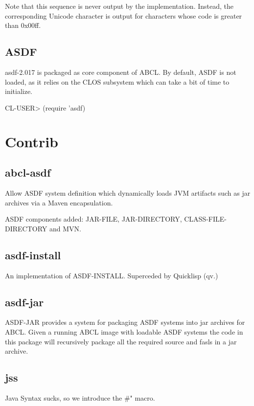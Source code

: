 \documentclass[10pt]{book}
\begin{document}
Note that this sequence is never output by the implementation.  Instead,
the corresponding Unicode character is output for characters whose
code is greater than 0x00ff.

\section{ASDF}

asdf-2.017 is packaged as core component of ABCL.  By default, ASDF is
not loaded, as it relies on the CLOS subsystem which can take a bit of
time to initialize.

\begin{listing-lisp}
CL-USER> (require 'asdf)
\end{listing-lisp}

\chapter{Contrib}

\section{abcl-asdf} 

Allow ASDF system definition which dynamically loads JVM artifacts
such as jar archives via a Maven encapsulation.

ASDF components added:  JAR-FILE, JAR-DIRECTORY, CLASS-FILE-DIRECTORY
and MVN.

\section{asdf-install}

An implementation of ASDF-INSTALL.  Superceded by Quicklisp (qv.)

\section{asdf-jar}

ASDF-JAR provides a system for packaging ASDF systems into jar
archives for ABCL.  Given a running ABCL image with loadable ASDF
systems the code in this package will recursively package all the
required source and fasls in a jar archive.

\section{jss}

Java Syntax sucks, so we introduce the \#" macro.
\end{document}
